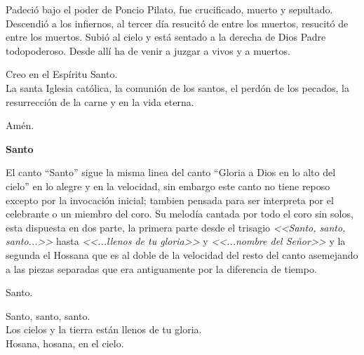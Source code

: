 \documentclass[12pt, letterpaper]{report}
\begin{document}
    \noindent
    Padeci\'o bajo el poder de Poncio Pilato, fue crucificado, muerto y sepultado. Descendi\'o a los infiernos, al tercer d\'ia resucit\'o de entre los muertos, resucit\'o de entre los muertos. Subi\'o al cielo y est\'a sentado a la derecha de Dios Padre todopoderoso. Desde all\'i ha de venir a juzgar a vivos y a muertos.

    \noindent
    Creo en el Esp\'iritu Santo.\\
    La santa Iglesia cat\'olica, la comuni\'on de los santos, el perd\'on de los pecados, la resurrecci\'on de la carne y en la vida eterna.

    \noindent
    Am\'en.
    \clearpage



    
    \begin{center}
        \Huge {\bfseries Santo}
    \end{center}

    \Large El canto ``Santo'' sigue la misma linea del canto ``Gloria a Dios en lo alto del cielo'' en lo alegre y en la velocidad, sin embargo este canto no tiene reposo excepto por la invocaci\'on inicial; tambien pensada para ser interpreta por el celebrante o un miembro del coro. Su melod\'ia cantada por todo el coro sin solos, esta dispuesta en dos parte, la primera parte desde el trisagio \textit{<<Santo, santo, santo...>>} hasta \textit{<<...llenos de tu gloria>>} y \textit{<<...nombre del Se\~nor>>} y la segunda el Hossana que es al doble de la velocidad del resto del canto asemejando a las piezas separadas que era antiguamente por la diferencia de tiempo.

    \noindent
    \LARGE Santo.

    \noindent
    Santo, santo, santo. \\
    Los cielos y la tierra est\'an llenos de tu gloria.\\
    Hosana, hosana, en el cielo.
\end{document}

